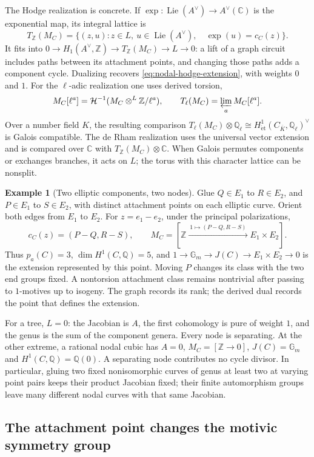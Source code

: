 \documentclass[11pt]{article}
\theoremstyle{definition}
\newtheorem{example}[theorem]{Example}
\theoremstyle{remark}
\newcommand{\Q}{\mathbb Q}
\newcommand{\Z}{\mathbb Z}
\newcommand{\C}{\mathbb C}
\begin{document}
The Hodge realization is concrete. If $\exp:\operatorname{Lie}(A^\vee)
\to A^\vee(\C)$ is the exponential map, its integral lattice is
\[
 T_\Z(M_C)=\{(z,u):z\in L,\ u\in\operatorname{Lie}(A^\vee),\quad
                         \exp(u)=c_C(z)\}.
\]
It fits into $0\to H_1(A^\vee,\Z)\to T_\Z(M_C)\to L\to0$:
a lift of a graph circuit includes paths between its attachment points,
and changing those paths adds a component cycle. Dualizing recovers
\eqref{eq:nodal-hodge-extension}, with weights $0$ and $1$.
For the $\ell$-adic realization one uses derived torsion,
\[
 M_C[\ell^a]=\mathcal H^{-1}(M_C\otimes^L\Z/\ell^a),\qquad
 T_\ell(M_C)=\varprojlim_a M_C[\ell^a].
\]
Over a number field $K$, the resulting comparison
$T_\ell(M_C)\otimes\Q_\ell\cong
H^1_{\mathrm{\acute et}}(C_{\overline K},\Q_\ell)^\vee$
is Galois compatible. The de Rham realization uses the universal vector
extension and is compared over $\C$ with $T_\Z(M_C)\otimes\C$.
When Galois permutes components or exchanges branches, it acts on $L$;
the torus with this character lattice can be nonsplit.

\begin{example}[Two elliptic components, two nodes]
Glue $Q\in E_1$ to $R\in E_2$, and $P\in E_1$ to $S\in E_2$, with
distinct attachment points on each elliptic curve. Orient both edges from
$E_1$ to $E_2$. For $z=e_1-e_2$, under the principal polarizations,
\[
 c_C(z)=(P-Q,R-S),\qquad
 M_C=[\Z\xrightarrow{\ 1\mapsto(P-Q,R-S)\ }E_1\times E_2].
\]
Thus $p_a(C)=3$, $\dim H^1(C,\Q)=5$, and
$1\to\mathbb G_m\to J(C)\to E_1\times E_2\to0$ is the extension
represented by this point. Moving $P$ changes its class with the two
end groups fixed. A nontorsion attachment class remains nontrivial after
passing to $1$-motives up to isogeny. The graph records its rank; the
derived dual records the point that defines the extension.
\end{example}

For a tree, $L=0$: the Jacobian is $A$, the first cohomology is pure of
weight $1$, and the genus is the sum of the component genera. Every node
is separating. At the other extreme, a rational nodal cubic has $A=0$,
$M_C=[\Z\to0]$, $J(C)=\mathbb G_m$ and $H^1(C,\Q)=\Q(0)$.
A separating node contributes no cycle divisor. In particular, gluing
two fixed nonisomorphic curves of genus at least two at varying point
pairs keeps their product Jacobian fixed; their finite automorphism
groups leave many different nodal curves with that same Jacobian.

\subsection{The attachment point changes the motivic symmetry group}
\label{sec:galois-attachment}
\end{document}
